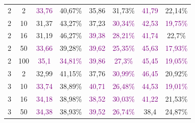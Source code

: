 \begin{table}[ht]
\begin{tabular}{cc|cc|cc|cc}
        {2}                           & {2}     & \textcolor{purple}{33,76}           & {40,67\%}                           & {35,86}                                  & {31,73\%}                   & \textcolor{purple}{41,79} & {22,14\%}                   \\
        {2}                           & {10}    & {31,37}                             & {43,27\%}                           & {37,23}                                  & \textcolor{purple}{30,34\%} & \textcolor{purple}{42,53} & \textcolor{purple}{19,75\%} \\
        {2}                           & {16}    & {31,19}                             & {46,27\%}                           & \textcolor{purple}{39,38}                & \textcolor{purple}{28,21\%} & \textcolor{purple}{41,74} & {22,7\%}                    \\
        {2}                           & {50}    & \textcolor{purple}{33,66}           & {39,28\%}                           & \textcolor{purple}{39,62}                & \textcolor{purple}{25,35\%} & \textcolor{purple}{45,63} & \textcolor{purple}{17,93\%} \\
        {2}                           & {100}   & \textcolor{purple}{35,1}            & \textcolor{purple}{34,81\%}         & \textcolor{purple}{39,86}                & \textcolor{purple}{27,3\%}  & \textcolor{purple}{45,45} & \textcolor{purple}{19,05\%} \\
        {3}                           & {2}     & {32,99}                             & {41,15\%}                           & {37,76}                                  & \textcolor{purple}{30,99\%} & \textcolor{purple}{46,45} & {20,92\%}                   \\
        {3}                           & {10}    & \textcolor{purple}{33,74}           & {38,89\%}                           & \textcolor{purple}{40,71}                & \textcolor{purple}{26,48\%} & \textcolor{purple}{44,53} & \textcolor{purple}{19,01\%} \\
        {3}                           & {16}    & \textcolor{purple}{34,18}           & {38,98\%}                           & \textcolor{purple}{38,52}                & \textcolor{purple}{30,03\%} & \textcolor{purple}{41,22} & {21,53\%}                   \\
        {3}                           & {50}    & \textcolor{purple}{34,38}           & {38,93\%}                           & \textcolor{purple}{39,52}                & \textcolor{purple}{26,74\%} & {38,4}                    & {24,87\%}                   \\

\end{tabular}
\end{table}
